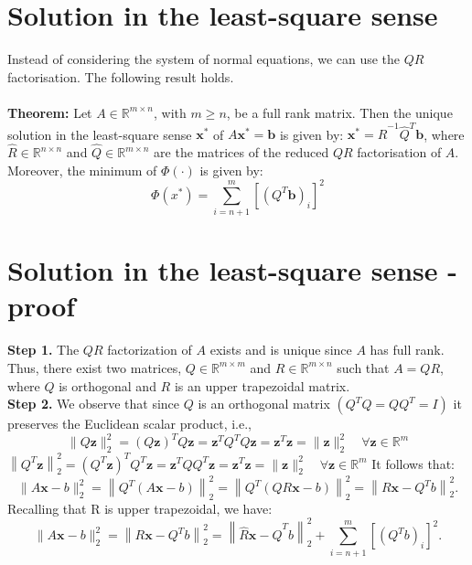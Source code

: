 \documentclass[11pt]{book}
\begin{document}
\section*{Solution in the least-square sense}
Instead of considering the system of normal equations, we can use the $Q R$ factorisation. The following result holds.\\ \\
\textbf{Theorem:} Let $A \in \mathbb{R}^{m \times n}$, with $m \geq n$, be a full rank matrix. Then the unique solution in the least-square sense $\mathbf{x}^{*}$ of $A \mathbf{x}^{*}=\mathbf{b}$ is given by:
$\mathbf{x}^{*}=\hat{R}^{-1} \hat{Q}^{T} \mathbf{b}$, where $\hat{R} \in \mathbb{R}^{n \times n}$ and $\hat{Q} \in \mathbb{R}^{m \times n}$ are the matrices of the reduced $Q R$ factorisation of $A$. Moreover, the minimum of $\Phi(\cdot)$ is given by:
$$\Phi\left(x^{*}\right)=\sum_{i=n+1}^{m}\left[\left(Q^{T} \mathbf{b}\right)_{i}\right]^{2}$$

\section*{Solution in the least-square sense - proof}
\textbf{Step 1.} The $Q R$ factorization of $A$ exists and is unique since $A$ has full rank. Thus, there exist two matrices, $Q \in \mathbb{R}^{m \times m}$ and $R \in \mathbb{R}^{m \times n}$ such that $A=Q R$, where $Q$ is orthogonal and $R$ is an upper trapezoidal matrix.\\
\textbf{Step 2.} We observe that since $Q$ is an orthogonal matrix $\left(Q^{T} Q=Q Q^{T}=I\right)$ it preserves the Euclidean scalar product, i.e.,
$$
\|Q \mathbf{z}\|_{2}^{2}=(Q \mathbf{z})^{T} Q \mathbf{z}=\mathbf{z}^{T} Q^{T} Q \mathbf{z}=\mathbf{z}^{T} \mathbf{z}=\|\mathbf{z}\|_{2}^{2} \quad \forall \mathbf{z} \in \mathbb{R}^{m}
$$
$\left\|Q^{T} \mathbf{z}\right\|_{2}^{2}=\left(Q^{T} \mathbf{z}\right)^{T} Q^{T} \mathbf{z}=\mathbf{z}^{T} Q Q^{T} \mathbf{z}=\mathbf{z}^{T} \mathbf{z}=\|\mathbf{z}\|_{2}^{2} \quad \forall \mathbf{z} \in \mathbb{R}^{m}$
It follows that:
$$
\|A \mathbf{x}-b\|_{2}^{2}=\left\|Q^{T}(A \mathbf{x}-b)\right\|_{2}^{2}=\left\|Q^{T}(Q R \mathbf{x}-b)\right\|_{2}^{2}=\left\|R \mathbf{x}-Q^{T} b\right\|_{2}^{2} .
$$
Recalling that $\mathrm{R}$ is upper trapezoidal, we have:
$$
\|A \mathbf{x}-b\|_{2}^{2}=\left\|R \mathbf{x}-Q^{T} b\right\|_{2}^{2}=\left\|\hat{R} \mathbf{x}-\hat{Q}^{T} b\right\|_{2}^{2}+\sum_{i=n+1}^{m}\left[\left(Q^{T} b\right)_{i}\right]^{2}.
$$
\end{document}

